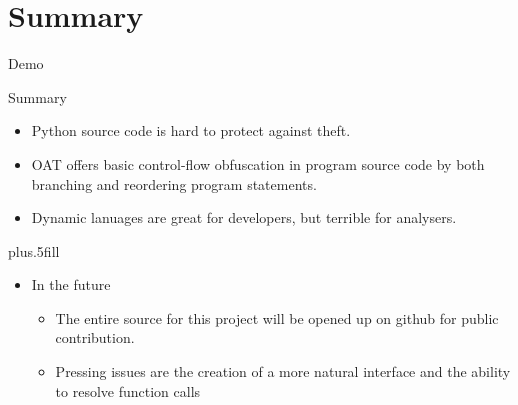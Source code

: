 \section*{Summary}

\begin{frame}{Demo}
\end{frame}

\begin{frame}{Summary}

\begin{itemize}
\item Python source code is \alert{hard to protect} against theft.
\item OAT offers basic control-flow obfuscation in program source code by both \alert{branching} and \alert{reordering} program statements.
\item Dynamic lanuages are great for developers, but terrible for analysers.
\end{itemize}
  
\vskip0pt plus.5fill
\begin{itemize}
\item In the future
\begin{itemize}
\item The entire source for this project will be opened up on github for public contribution.
\item Pressing issues are the creation of a more natural interface and the ability to resolve function calls
\end{itemize}
\end{itemize}
\end{frame}




